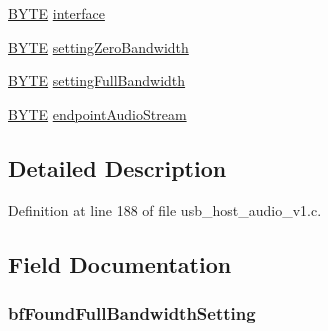 \begin{DoxyCompactItemize}
\begin{tabbing}
\end{tabbing}\item 
\hyperlink{_generic_type_defs_8h_a4ae1dab0fb4b072a66584546209e7d58}{B\+Y\+T\+E} \hyperlink{struct___u_s_b___a_u_d_i_o___d_e_v_i_c_e___i_n_f_o_a6e65d646f7737013c8389976f1e27806}{interface}
\item 
\hyperlink{_generic_type_defs_8h_a4ae1dab0fb4b072a66584546209e7d58}{B\+Y\+T\+E} \hyperlink{struct___u_s_b___a_u_d_i_o___d_e_v_i_c_e___i_n_f_o_ac42ff995830e07abf9468b9584ac4c9a}{setting\+Zero\+Bandwidth}
\item 
\hyperlink{_generic_type_defs_8h_a4ae1dab0fb4b072a66584546209e7d58}{B\+Y\+T\+E} \hyperlink{struct___u_s_b___a_u_d_i_o___d_e_v_i_c_e___i_n_f_o_a9abdf10d3c4cd7fe49de5ca7fa97a4b6}{setting\+Full\+Bandwidth}
\item 
\hyperlink{_generic_type_defs_8h_a4ae1dab0fb4b072a66584546209e7d58}{B\+Y\+T\+E} \hyperlink{struct___u_s_b___a_u_d_i_o___d_e_v_i_c_e___i_n_f_o_add2ff604c32971c9a319b403b100a4d4}{endpoint\+Audio\+Stream}
\end{DoxyCompactItemize}


\subsection{Detailed Description}


Definition at line 188 of file usb\+\_\+host\+\_\+audio\+\_\+v1.\+c.



\subsection{Field Documentation}
\hypertarget{struct___u_s_b___a_u_d_i_o___d_e_v_i_c_e___i_n_f_o_a11e2b8c2f1fce70b7658af26c1f22b72}{}
\subsubsection[{bf\+Found\+Full\+Bandwidth\+Setting}]{ bf\+Found\+Full\+Bandwidth\+Setting}\label{struct___u_s_b___a_u_d_i_o___d_e_v_i_c_e___i_n_f_o_a11e2b8c2f1fce70b7658af26c1f22b72}


